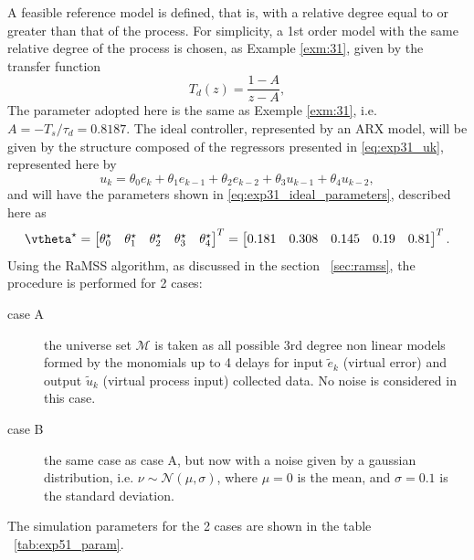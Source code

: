 \begin{exmp}
  A feasible reference model is defined, that is, with a relative degree equal to or greater than that of the process. For simplicity, a 1st order model with the same relative degree of the process is chosen, as Example \ref{exm:31}, given by the transfer function
  \begin{equation}
    T_d(z) = \frac{1-A}{z-A},
    \label{eq:mr_sis2aord}
  \end{equation}
  The parameter adopted here is the same as Exemple \ref{exm:31}, i.e. $A = -T_s/\tau_d = 0.8187$. 
  The ideal controller, represented by an ARX model, will be given by the structure composed of the regressors presented in \eqref{eq:exp31_uk}, represented here by
  \begin{equation}
    \label{eq:exp51_contIdeal}
    u_k = \theta_0e_{k} + \theta_1e_{k-1} + \theta_2e_{k-2} + \theta_3u_{k-1} + \theta_4u_{k-2},
  \end{equation}
  and will have the parameters shown in \eqref{eq:exp31_ideal_parameters}, described here as
  \begin{equation}
    \vtheta^\star= \begin{bmatrix} \theta^\star_0 & \theta^\star_1 & \theta^\star_2 & \theta^\star_3 & \theta^\star_4 \end{bmatrix}^T =  \begin{bmatrix} 0.181 & 0.308 &  0.145 &  0.19 & 0.81 \end{bmatrix}^T.
  \label{eq:ex51_ideal_parameters}
\end{equation}
Using the RaMSS algorithm, as discussed in the section ~\ref{sec:ramss}, the procedure is performed for 2 cases:
\begin{description}
  \item[case A] the universe set $\mathscr{M}$ is taken as all possible 3rd degree non linear models formed by the monomials up to 4 delays for input $\tilde{e}_k$ (virtual error) and output $\tilde{u}_k$ (virtual process input) collected data. No noise is considered in this case.
  \item[case B] the same case as case A, but now with a noise given by a gaussian distribution, i.e. $\nu \sim \mathcal{N}(\mu,\sigma)$, where $\mu=0$ is the mean, and $\sigma= 0.1$ is the standard deviation.
\end{description}
The simulation parameters for the 2 cases are shown in the table ~\ref{tab:exp51_param}.



\end{exmp}
